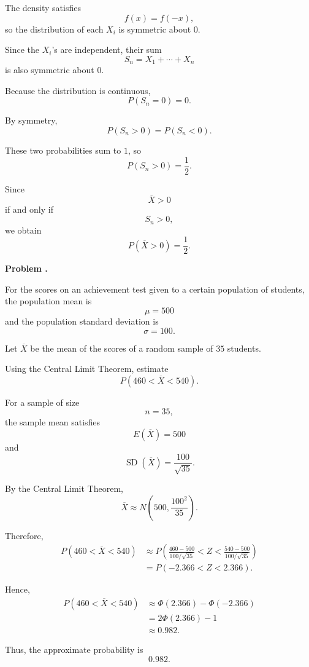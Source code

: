 \documentclass[11pt]{article}
\newcounter{problem}
\newenvironment{problem}[1][]{
    \refstepcounter{problem}
    \begin{problemheader}
        \textbf{Problem \theproblem%
        \if\relax\detokenize{#1}\relax
        \else. #1%
        \fi}
    \end{problemheader}
}{
    \vspace{0.5em}
}
\newenvironment{solution}{
    \par
    \begin{tcolorbox}[
        colback=white,
        colframe=uwgold,
        boxrule=0.7pt,
        arc=2mm,
        left=3mm,
        right=3mm,
        top=2mm,
        bottom=2mm,
        breakable,
        before skip=0.5em,
        after skip=1em,
        title=\textbf{Solution},
        coltitle=uwpurple,
        fonttitle=\bfseries
    ]
}{
    \end{tcolorbox}
}
\begin{document}
\begin{solution}

The density satisfies
\[
f(x)=f(-x),
\]
so the distribution of each \(X_i\) is symmetric about \(0\).

Since the \(X_i\)'s are independent, their sum
\[
S_n=X_1+\cdots+X_n
\]
is also symmetric about \(0\).

Because the distribution is continuous,
\[
P(S_n=0)=0.
\]

By symmetry,
\[
P(S_n>0)
=
P(S_n<0).
\]

These two probabilities sum to \(1\), so
\[
P(S_n>0)=\frac12.
\]

Since
\[
\overline X>0
\]
if and only if
\[
S_n>0,
\]
we obtain
\[
P(\overline X>0)=\frac12.
\]

\end{solution}



\newpage
\begin{problem}

For the scores on an achievement test given to a certain population of
students, the population mean is
\[
\mu=500
\]
and the population standard deviation is
\[
\sigma=100.
\]

Let \(\overline X\) be the mean of the scores of a random sample of
\(35\) students.

Using the Central Limit Theorem, estimate
\[
P(460<\overline X<540).
\]

\end{problem}

\begin{solution}

For a sample of size
\[
n=35,
\]
the sample mean satisfies
\[
E(\overline X)=500
\]
and
\[
\operatorname{SD}(\overline X)
=
\frac{100}{\sqrt{35}}.
\]

By the Central Limit Theorem,
\[
\overline X
\approx
N\left(
500,
\frac{100^2}{35}
\right).
\]

Therefore,
\[
\begin{aligned}
P(460<\overline X<540)
&\approx
P\left(
\frac{460-500}{100/\sqrt{35}}
<
Z
<
\frac{540-500}{100/\sqrt{35}}
\right)\\
&=
P(-2.366<Z<2.366).
\end{aligned}
\]

Hence,
\[
\begin{aligned}
P(460<\overline X<540)
&\approx
\Phi(2.366)-\Phi(-2.366)\\
&=
2\Phi(2.366)-1\\
&\approx
0.982.
\end{aligned}
\]

Thus, the approximate probability is
\[
0.982.
\]

\end{solution}
\end{document}

